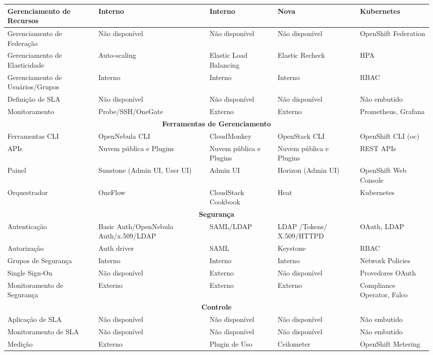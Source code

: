 \begin{longtable}{|p{3cm}|p{2.8cm}|p{2.8cm}|p{2.8cm}|p{2.8cm}|}
\hline
Gerenciamento de Recursos & Interno & Interno & Nova & Kubernetes \\
\hline
Gerenciamento de Federação & Não disponível & Não disponível & Não disponível & OpenShift Federation \\
\hline
Gerenciamento de Elasticidade & Auto-scaling & Elastic Load Balancing & Elastic Recheck & HPA \\
\hline
Gerenciamento de Usuários/Grupos & Interno & Interno & Interno & RBAC \\
\hline
Definição de SLA & Não disponível & Não disponível & Não disponível & Não embutido \\
\hline
Monitoramento & Probe/SSH/OneGate & Externo & Externo & Prometheus, Grafana \\
\hline
\multicolumn{5}{|c|}{\textbf{Ferramentas de Gerenciamento}} \\
\hline
Ferramentas CLI & OpenNebula CLI & CloudMonkey & OpenStack CLI & OpenShift CLI (oc) \\
\hline
APIs & Nuvem pública e Plugins & Nuvem pública e Plugins & Nuvem pública e Plugins & REST APIs \\
\hline
Painel & Sunstone (Admin UI, User UI) & Admin UI & Horizon (Admin UI) & OpenShift Web Console \\
\hline
Orquestrador & OneFlow & CloudStack Cookbook & Heat & Kubernetes \\
\hline
\multicolumn{5}{|c|}{\textbf{Segurança}} \\
\hline
Autenticação & Basic Auth/OpenNebula Auth/x.509/LDAP & SAML/LDAP & LDAP /Tokens/ X.509/HTTPD & OAuth, LDAP \\
\hline
Autorização & Auth driver & SAML & Keystone & RBAC \\
\hline
Grupos de Segurança & Interno & Interno & Interno & Network Policies \\
\hline
Single Sign-On & Não disponível & Externo & Não disponível & Provedores OAuth \\
\hline
Monitoramento de Segurança & Externo & Externo & Externo & Compliance Operator, Falco \\
\hline
\multicolumn{5}{|c|}{\textbf{Controle}} \\
\hline
Aplicação de SLA & Não disponível & Não disponível & Não disponível & Não embutido \\
\hline
Monitoramento de SLA & Não disponível & Não disponível & Não disponível & Não embutido \\
\hline
Medição & Externo & Plugin de Uso & Ceilometer & OpenShift Metering \\

\end{longtable}

